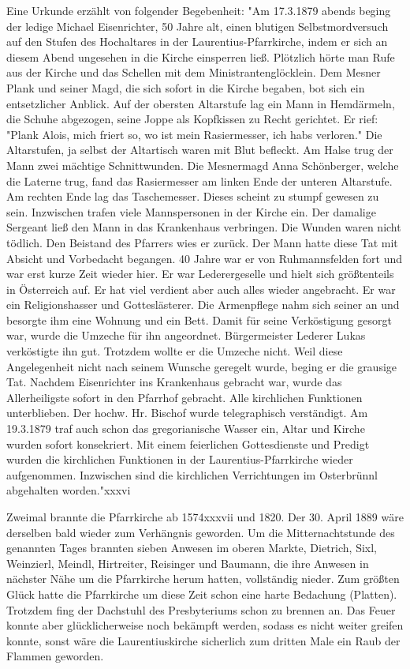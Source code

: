 \documentclass{book}
\begin{document}
Eine Urkunde erzählt von folgender Begebenheit: "Am 17.3.1879 abends beging der
ledige Michael Eisenrichter, 50 Jahre alt, einen blutigen Selbstmordversuch auf
den Stufen des Hochaltares in der Laurentius-Pfarrkirche, indem er sich an
diesem Abend ungesehen in die Kirche einsperren ließ. Plötzlich hörte man Rufe
aus der Kirche und das Schellen mit dem Ministrantenglöcklein. Dem Mesner Plank
und seiner Magd, die sich sofort in die Kirche begaben, bot sich ein
entsetzlicher Anblick. Auf der obersten Altarstufe lag ein Mann in Hemdärmeln,
die Schuhe abgezogen, seine Joppe als Kopfkissen zu Recht gerichtet. Er rief:
"Plank Alois, mich friert so, wo ist mein Rasiermesser, ich habs verloren." Die
Altarstufen, ja selbst der Altartisch waren mit Blut befleckt. Am Halse trug der
Mann zwei mächtige Schnittwunden. Die Mesnermagd Anna Schönberger, welche die
Laterne trug, fand das Rasiermesser am linken Ende der unteren Altarstufe. Am
rechten Ende lag das Taschemesser. Dieses scheint zu stumpf gewesen zu sein.
Inzwischen trafen viele Mannspersonen in der Kirche ein. Der damalige Sergeant
ließ den Mann in das Krankenhaus verbringen. Die Wunden waren nicht tödlich. Den
Beistand des Pfarrers wies er zurück. Der Mann hatte diese Tat mit Absicht und
Vorbedacht begangen. 40 Jahre war er von Ruhmannsfelden fort und war erst kurze
Zeit wieder hier. Er war Lederergeselle und hielt sich größtenteils in
Österreich auf. Er hat viel verdient aber auch alles wieder angebracht. Er war
ein Religionshasser und Gotteslästerer. Die Armenpflege nahm sich seiner an und
besorgte ihm eine Wohnung und ein Bett. Damit für seine Verköstigung gesorgt
war, wurde die Umzeche für ihn angeordnet. Bürgermeister Lederer Lukas
verköstigte ihn gut. Trotzdem wollte er die Umzeche nicht. Weil diese
Angelegenheit nicht nach seinem Wunsche geregelt wurde, beging er die grausige
Tat. Nachdem Eisenrichter ins Krankenhaus gebracht war, wurde das Allerheiligste
sofort in den Pfarrhof gebracht. Alle kirchlichen Funktionen unterblieben. Der
hochw. Hr. Bischof wurde telegraphisch verständigt. Am 19.3.1879 traf auch schon
das gregorianische Wasser ein, Altar und Kirche wurden sofort konsekriert. Mit
einem feierlichen Gottesdienste und Predigt wurden die kirchlichen Funktionen in
der Laurentius-Pfarrkirche wieder aufgenommen. Inzwischen sind die kirchlichen
Verrichtungen im Osterbrünnl abgehalten worden."xxxvi

Zweimal brannte die Pfarrkirche ab 1574xxxvii und 1820. Der 30. April 1889 wäre
derselben bald wieder zum Verhängnis geworden. Um die Mitternachtstunde des
genannten Tages brannten sieben Anwesen im oberen Markte, Dietrich, Sixl,
Weinzierl, Meindl, Hirtreiter, Reisinger und Baumann, die ihre Anwesen in
nächster Nähe um die Pfarrkirche herum hatten, vollständig nieder. Zum größten
Glück hatte die Pfarrkirche um diese Zeit schon eine harte Bedachung (Platten).
Trotzdem fing der Dachstuhl des Presbyteriums schon zu brennen an. Das Feuer
konnte aber glücklicherweise noch bekämpft werden, sodass es nicht weiter
greifen konnte, sonst wäre die Laurentiuskirche sicherlich zum dritten Male ein
Raub der Flammen geworden.
\end{document}
